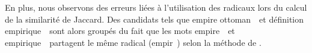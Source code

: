     En plus, nous observons des erreurs liées à l'utilisation des radicaux lors
    du calcul de la similarité de Jaccard. Des candidats tels que \og empire
    ottoman~\fg\ et \og définition empirique~\fg\ sont alors groupés du fait que
    les mots \og empire~\fg\ et \og empirique~\fg\ partagent le même radical
    (\og empir~\fg) selon la méthode de  .

